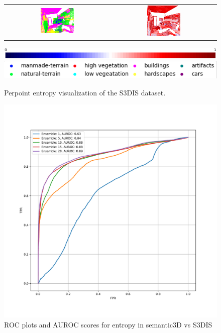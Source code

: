 \begin{figure}[h!]
\begin{tabular}{cc}
            \includegraphics[width=0.33\textwidth, height=0.18\textheight]{images/seg_output/s3dis_DE/S3DIS_4_Pred.png}& 
            \includegraphics[width=0.33\textwidth, height=0.18\textheight]{images/seg_output/s3dis_DE/S3DIS_4_Entropy.png}\\
        \end{tabular}
        \includegraphics[scale=0.213]{images/color_legend.pdf}
        \includegraphics[scale=0.65]{images/legend.png}
        \caption{Perpoint entropy visualization of the S3DIS dataset.}
    \end{figure}
    \begin{figure}[h!]
        \centering
        \includegraphics[scale=0.65]{images/entropy_sem3dvs3dis_AUROC.pdf}
        \caption{ROC plots and AUROC scores for entropy in semantic3D vs S3DIS}
        \label{fig:AUROC_Ent_Sem3dvs3dis}
    \end{figure}


